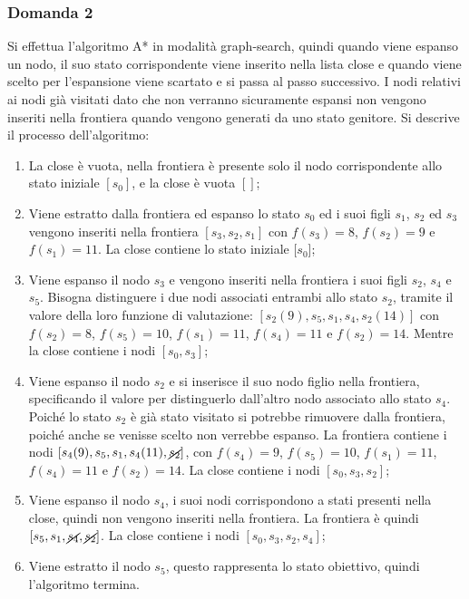 \documentclass{article}
\numberwithin{equation}{section}
\begin{document}
\subsubsection*{Domanda 2}


Si effettua l'algoritmo A* in modalità graph-search, quindi quando viene espanso un nodo, il suo stato corrispondente viene inserito nella lista close e quando viene scelto per l'espansione viene scartato e si passa al passo successivo. I nodi relativi ai nodi già visitati dato che non verranno sicuramente espansi non vengono inseriti nella frontiera quando vengono generati da uno stato genitore. Si descrive il processo dell'algoritmo:
\begin{enumerate}
    \item La close è vuota, nella frontiera è presente solo il nodo corrispondente allo stato iniziale $[s_0]$, e la close è vuota $[]$;
    \item Viene estratto dalla frontiera ed espanso lo stato $s_0$ ed i suoi figli $s_1$, $s_2$ ed $s_3$ vengono inseriti nella frontiera $[s_3,s_2,s_1]$ con $f(s_3)=8$, $f(s_2)=9$ e $f(s_1)=11$. La close contiene lo stato iniziale $[s_0$];
    \item Viene espanso il nodo $s_3$ e vengono inseriti nella frontiera i suoi figli $s_2$, $s_4$ e $s_5$. Bisogna distinguere i due nodi associati entrambi allo stato $s_2$, tramite il valore della loro funzione di valutazione: $[s_2(9),s_5,s_1,s_4,s_2(14)]$ con $f(s_2)=8$, $f(s_5)=10$, $f(s_1)=11$, $f(s_4)=11$ e $f(s_2)=14$. Mentre la close contiene i nodi $[s_0,s_3]$;
    \item Viene espanso il nodo $s_2$ e si inserisce il suo nodo figlio nella frontiera, specificando il valore per distinguerlo dall'altro nodo associato allo stato $s_4$. Poiché lo stato $s_2$ è già stato visitato si potrebbe rimuovere dalla frontiera, poiché anche se venisse scelto non verrebbe espanso. La frontiera contiene i nodi $[s_4(9),s_5,s_1,s_4(11),\cancel{s_2}]$, con $f(s_4)=9$, $f(s_5)=10$, $f(s_1)=11$, $f(s_4)=11$ e $f(s_2)=14$. La close contiene i nodi $[s_0,s_3,s_2]$;
    \item Viene espanso il nodo $s_4$, i suoi nodi corrispondono a stati presenti nella close, quindi non vengono inseriti nella frontiera. La frontiera è quindi $[s_5,s_1,\cancel{s_4},\cancel{s_2}]$. La close contiene i nodi $[s_0,s_3,s_2,s_4]$;
    \item Viene estratto il nodo $s_5$, questo rappresenta lo stato obiettivo, quindi l'algoritmo termina. 
\end{enumerate}
\end{document}
